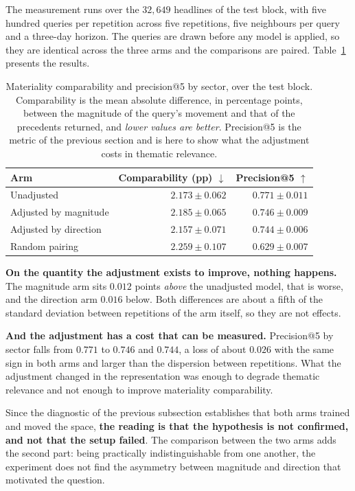 The measurement runs over the $32{,}649$ headlines of the test block, with five hundred queries
per repetition across five repetitions, five neighbours per query and a three-day horizon. The
queries are drawn before any model is applied, so they are identical across the three arms and
the comparisons are paired. Table~\ref{tab:av_qi4_resultado} presents the results.

\begin{table}[htbp]
\centering
\small
\caption[Result of the adjustment for comparable materiality]{Materiality comparability and
precision@5 by sector, over the test block. Comparability is the mean absolute difference, in
percentage points, between the magnitude of the query's movement and that of the precedents
returned, and \emph{lower values are better}. Precision@5 is the metric of the previous section
and is here to show what the adjustment costs in thematic relevance.}
\label{tab:av_qi4_resultado}
\begin{tabular}{lrr}
\toprule
Arm & Comparability (pp) $\downarrow$ & Precision@5 $\uparrow$ \\
\midrule
Unadjusted                 & $\mathbf{2.173 \pm 0.062}$ & $\mathbf{0.771 \pm 0.011}$ \\
Adjusted by magnitude      & $2.185 \pm 0.065$          & $0.746 \pm 0.009$ \\
Adjusted by direction      & $2.157 \pm 0.071$          & $0.744 \pm 0.006$ \\
Random pairing             & $2.259 \pm 0.107$          & $0.629 \pm 0.007$ \\
\bottomrule
\end{tabular}
\end{table}

\textbf{On the quantity the adjustment exists to improve, nothing happens.} The magnitude arm
sits $0.012$ points \emph{above} the unadjusted model, that is worse, and the direction arm
$0.016$ below. Both differences are about a fifth of the standard deviation between repetitions
of the arm itself, so they are not effects.

\textbf{And the adjustment has a cost that can be measured.} Precision@5 by sector falls from
$0.771$ to $0.746$ and $0.744$, a loss of about $0.026$ with the same sign in both arms and
larger than the dispersion between repetitions. What the adjustment changed in the representation
was enough to degrade thematic relevance and not enough to improve materiality comparability.

Since the diagnostic of the previous subsection establishes that both arms trained and moved the
space, \textbf{the reading is that the hypothesis is not confirmed, and not that the setup
failed}. The comparison between the two arms adds the second part: being practically
indistinguishable from one another, the experiment does not find the asymmetry between magnitude
and direction that motivated the question.

